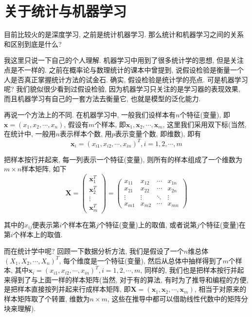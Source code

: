 \documentclass[a4paper,UTF8]{ctexart}
\theoremstyle{plain} \newtheorem{theorem}{定理}[section]
\theoremstyle{plain} \newtheorem{definition}{定义}[section]
\theoremstyle{plain} \newtheorem{lemma}{引理}[section]
\theoremstyle{plain} \newtheorem{proposition}{命题}[section]
\theoremstyle{plain} \newtheorem{example}{例}[section]
\theoremstyle{plain} \newtheorem{remark}{注}[section]
\theoremstyle{plain} \newtheorem{corollary}{推论}[section]
\begin{document}
\section{关于统计与机器学习}
目前比较火的是深度学习, 之前是统计机器学习. 那么统计和机器学习之间的关系和区别到底是什么?

我这里只说一下自己的个人理解. 机器学习中用到了很多统计学的思想, 但是关注点是不一样的. 之前在概率论与数理统计的课本中曾提到, 说假设检验是衡量一个人是否真正掌握统计方法的试金石. 确实, 假设检验是统计学的亮点. 可是机器学习呢? 我们貌似很少看到过假设检验, 因为机器学习只关注的是学习器的表现效果, 而且机器学习有自己的一套方法去衡量它, 也就是模型的泛化能力.

再说一个方法上的不同. 在机器学习中, 一般我们设样本有$n$个特征(变量), 即$\bm{x} = (x_1, x_2, \cdots, x_n)$, 假设有$m$个样本, 即$\bm{x}_1, \bm{x}_2, \cdots, \bm{x}_{m}$, 这里我们采用双下标(当然, 在统计中, 一般用$n$表示样本个数, 用$p$表示变量个数, 即维数), 即有
\begin{equation*}
\bm{x}_{i} = (x_{i1}, x_{i2}, \cdots, x_{in})^{T}, i = 1, 2, \cdots, m
\end{equation*}

把样本按行并起来, 每一列表示一个特征(变量), 则所有的样本组成了一个维数为$m \times n$样本矩阵, 如下
$$
\bm{X} = 
\begin{pmatrix}
\bm{x}_{1}^{T} \\ 
\bm{x}_{2}^{T} \\ 
\vdots \\ 
\bm{x}_{m}^{T}
\end{pmatrix}
= 
\begin{pmatrix}
x_{11}  &  x_{12}  &  \cdots  &  x_{1n} \\ 
x_{21}  &  x_{22}  &  \cdots  &  x_{2n} \\ 
\vdots  &  \vdots  &  \ddots  &  \vdots \\ 
x_{m1}  &  x_{m2}  &  \cdots  &  x_{mn}
\end{pmatrix}
$$

其中的$x_{ij}$便表示第$i$个样本在第$j$个特征(变量)上的取值, 或者说第$j$个特征(变量)在第$i$个样本上的取值.

而在统计学中呢? 回顾一下数据分析方法, 我们是假设了一个$n$维总体$(X_1, X_2, \cdots, X_n)^{T}$, 每个维度是一个特征(变量), 然后从总体中抽样得到了$m$个样本, 其中$\bm{x}_{i} = (x_{i1}, x_{i2}, \cdots, x_{in})^{T}, i = 1, 2, \cdots, m$, 同样的, 我们也是把样本按行并起来得到了与上面一样的样本矩阵(当然, 对于有的算法, 有时为了推导和编程的方便, 是把样本直接按列并起来行成样本矩阵, 即$\bm{X} = (\bm{x}_1, \bm{x}_2, \cdots, \bm{x}_m)$, 相当于对原来的样本矩阵取了个转置, 维数为$n \times m$, 这些在推导中都可以借助线性代数中的矩阵分块来理解).
\end{document}
